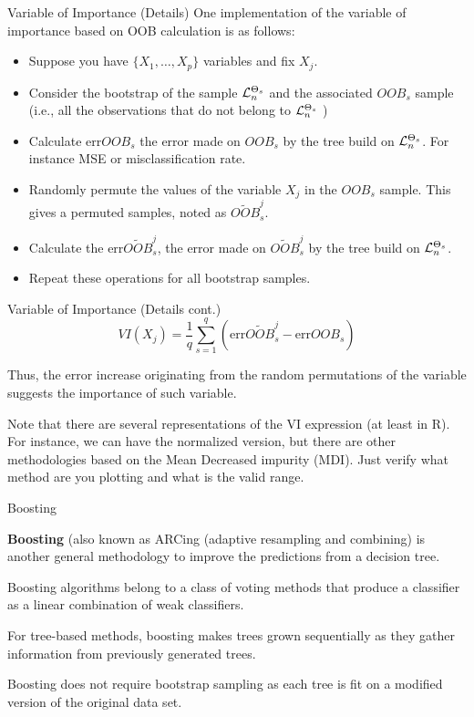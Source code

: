 \documentclass{beamer}
\begin{document}
\begin{frame}{Variable of Importance (Details)}
	One implementation of the variable of importance based on OOB calculation is as follows:
	\begin{itemize}
		\item Suppose you have $\{X_1, \ldots, X_p\}$ variables and fix $X_j$. 
		\item Consider the bootstrap of the sample ${\cal L}_n^{\Theta_s}$ and the associated $OOB_s$ sample (i.e., all the observations that do not belong to ${\cal L}_n^{\Theta_s}$ )
		\item Calculate $\text{err}OOB_s$ the error made on $OOB_s$ by the tree build on ${\cal L}_n^{\Theta_s}$. For instance MSE or misclassification rate.
		\item Randomly permute the values of the variable $X_j$ in the $OOB_s$ sample. This gives a permuted samples, noted as $\widetilde{OOB}_s^j$.
		\item Calculate the $\text{err}\widetilde{OOB}_s^j$, the error made on $\widetilde{OOB}_s^j$ by the tree build on ${\cal L}_n^{\Theta_s}$.
		\item Repeat these operations for all bootstrap samples. 
\end{itemize}
		
\end{frame}

\begin{frame}{Variable of Importance (Details cont.)}
	\begin{equation*}
		VI(X_j)= \frac{1}{q} \sum_{s=1}^q (\text{err}\widetilde{OOB}_s^j- \text{err}OOB_s)
	\end{equation*}	

Thus, the error increase originating from the random permutations of the variable suggests the importance of such variable. 

Note that there are several representations of the VI expression (at least in R). For instance, we can have the normalized version, but there are other methodologies based on the Mean Decreased impurity (MDI). Just verify what method are you plotting and what is the valid range. 

\end{frame}
	

\begin{frame}{Boosting}
	
	{\bf Boosting} (also known as ARCing (adaptive resampling and combining) is another general methodology to improve the predictions from a decision tree.
	
	Boosting algorithms belong to a class of voting methods that produce a classifier as a linear combination of weak classifiers.
	 
	For tree-based methods, boosting makes trees grown sequentially as they gather information from previously generated trees. 
	
	
 Boosting does not require bootstrap sampling as each tree is fit on a modified version of the original data set.
 
 
	
\end{frame}
\end{document}
